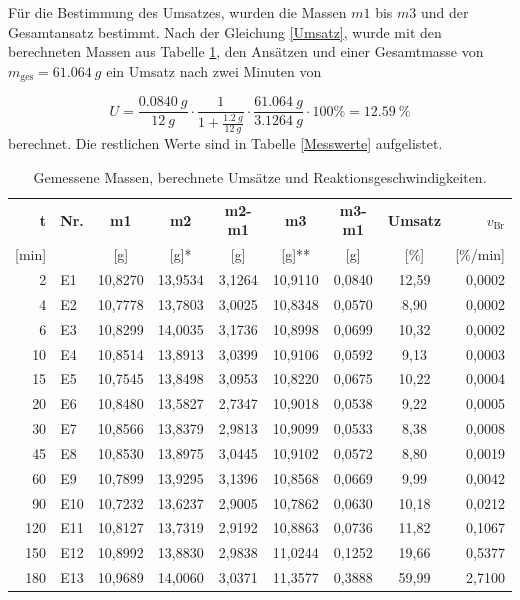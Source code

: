 \documentclass[10pt,a4paper,ngerman]{scrartcl}
\begin{document}
	Für die Bestimmung des Umsatzes, wurden die Massen $m1$ bis $m3$ und der Gesamtansatz bestimmt. Nach der Gleichung \eqref{Umsatz}, wurde mit den berechneten Massen aus Tabelle \ref{Messwerte}, 
	den Ansätzen und einer Gesamtmasse von $m_\text{ges} = \SI{61,064}{g}$ ein Umsatz nach zwei Minuten von 

	\begin{equation}
		U = \frac{\SI{0,0840}{g}}{\SI{12}{g}} \cdot \frac{1}{1 + \frac{\SI{1,2}{g}}{\SI{12}{g}}}\cdot \frac{\SI{61,064}{g}}{\SI{3,1264}{g}} \cdot 100\% = \SI{12,59}{\%}
	\end{equation}
	berechnet. Die restlichen Werte sind in Tabelle \eqref{Messwerte} aufgelistet.
	\begin{table}[H]
    \centering
    \small %
    \setlength{\tabcolsep}{4pt} %
    \caption{Gemessene Massen, berechnete Umsätze und Reaktionsgeschwindigkeiten.}
    \label{Messwerte}
    \begin{tabular}{@{} r l c c c c c c r @{}}
        \toprule
        \textbf{t} & \textbf{Nr.} & \textbf{m1} & \textbf{m2} & \textbf{m2-m1} & \textbf{m3} & \textbf{m3-m1} & \textbf{Umsatz} & \textbf{$v_\text{Br}$} \\ 
        {[min]} & & {[g]} & {[g]*} & {[g]} & {[g]**} & {[g]} & {[\%]} & {[\%/min]} \\ \midrule
        2   & E1  & 10,8270 & 13,9534 & 3,1264 & 10,9110 & 0,0840 & 12,59 & 0,0002 \\
        4   & E2  & 10,7778 & 13,7803 & 3,0025 & 10,8348 & 0,0570 & 8,90  & 0,0002 \\
        6   & E3  & 10,8299 & 14,0035 & 3,1736 & 10,8998 & 0,0699 & 10,32 & 0,0002 \\
        10  & E4  & 10,8514 & 13,8913 & 3,0399 & 10,9106 & 0,0592 & 9,13  & 0,0003 \\
        15  & E5  & 10,7545 & 13,8498 & 3,0953 & 10,8220 & 0,0675 & 10,22 & 0,0004 \\
        20  & E6  & 10,8480 & 13,5827 & 2,7347 & 10,9018 & 0,0538 & 9,22  & 0,0005 \\
        30  & E7  & 10,8566 & 13,8379 & 2,9813 & 10,9099 & 0,0533 & 8,38  & 0,0008 \\
        45  & E8  & 10,8530 & 13,8975 & 3,0445 & 10,9102 & 0,0572 & 8,80  & 0,0019 \\
        60  & E9  & 10,7899 & 13,9295 & 3,1396 & 10,8568 & 0,0669 & 9,99  & 0,0042 \\
        90  & E10 & 10,7232 & 13,6237 & 2,9005 & 10,7862 & 0,0630 & 10,18 & 0,0212 \\
        120 & E11 & 10,8127 & 13,7319 & 2,9192 & 10,8863 & 0,0736 & 11,82 & 0,1067 \\
        150 & E12 & 10,8992 & 13,8830 & 2,9838 & 11,0244 & 0,1252 & 19,66 & 0,5377 \\
        180 & E13 & 10,9689 & 14,0060 & 3,0371 & 11,3577 & 0,3888 & 59,99 & 2,7100 \\ 
        \bottomrule
    \end{tabular}
\end{table}
\end{document}
